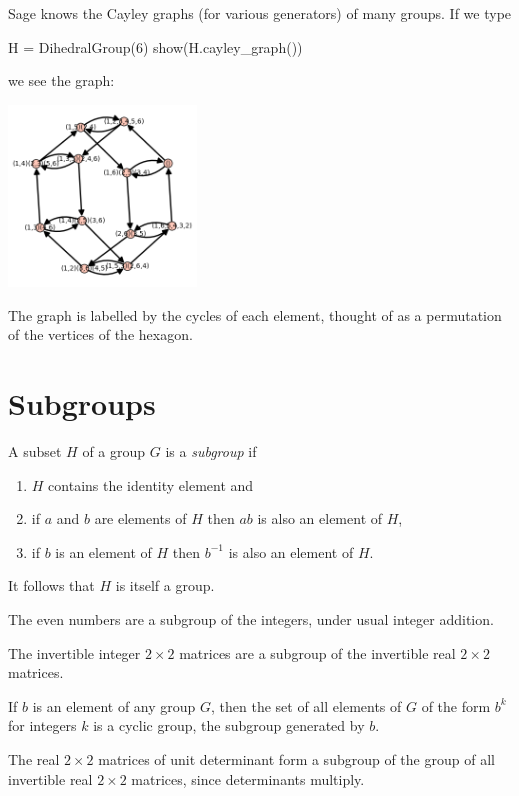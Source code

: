 Sage knows the Cayley graphs (for various generators) of many groups.
If we type
\begin{sageblock}
H = DihedralGroup(6)
show(H.cayley_graph())
\end{sageblock}
we see the graph:
\begin{center}
\includegraphics[width=5cm]{cayley-graph-d6.png}
\end{center}
The graph is labelled by the cycles of each element, thought of as a permutation of the vertices of the hexagon.

\section{Subgroups}

A subset \(H\) of a group \(G\) is a \emph{subgroup} if
\begin{enumerate}
\item
\(H\) contains the identity element and
\item
if \(a\) and \(b\) are elements of \(H\) then \(ab\) is also an element of \(H\), 
\item
if \(b\) is an element of \(H\) then \(b^{-1}\) is also an element of \(H\).
\end{enumerate}

It follows that \(H\) is itself a group.

\begin{example}
The even numbers are a subgroup of the integers, under usual integer addition.
\end{example}
\begin{example}
The invertible integer \(2 \times 2\) matrices are a subgroup of the invertible real \(2 \times 2\) matrices.
\end{example}
\begin{example}
If \(b\) is an element of any group \(G\), then the set of all elements of \(G\) of the form \(b^k\) for integers \(k\) is a cyclic group, the subgroup generated by \(b\).
\end{example}
\begin{example}
The real \(2 \times 2\) matrices of unit determinant form a subgroup of the group of all invertible real \(2 \times 2\) matrices, since determinants multiply.
\end{example}

